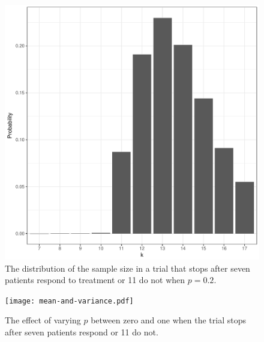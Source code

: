 \documentclass[12pt]{article}
\begin{document}

\begin{figure}[bp!]
\centering
\includegraphics[width=\textwidth]{snb-first-plot.pdf}
\caption{
The distribution of the sample size in a trial that stops after seven patients
respond to treatment or 11 do not when $p=0.2$.
}
\label{fig:kane_viz_1}
\end{figure}

\begin{figure}[bp!]
\centering
\texttt{[image: mean-and-variance.pdf]}
\caption{
The effect of varying $p$ between zero and one when the trial stops after
seven patients respond or 11 do not.
}
\label{fig:kane_viz_2}
\end{figure}


\end{document}
